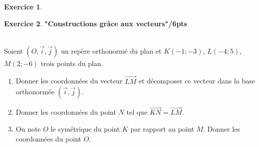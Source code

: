 \documentclass[a4paper,10.9pt]{article}
\theoremstyle{definition}
\newtheorem{exo}{Exercice}
\newcommand{\V}{\overrightarrow}
\begin{document}
\begin{exo}
\begin{minipage}[c]{1.0\linewidth}
\begin{minipage}[c]{0.45\linewidth}
\end{minipage}
\end{minipage}
\end{exo}

\begin{exo} \textbf{"Constructions grâce aux vecteurs"}\hfill\textbf{/6pts}\\\hfil\\

\begin{minipage}[t]{1.0\linewidth}
Soient $(O,\V{i}, \V{j})$ un repère orthonormé du plan et $K(-1;-3)$, $L(-4;5)$,  $M(2;-6)$ trois points du plan.\\ 
\begin{enumerate}
\item Donner les coordonnées du vecteur $\V{LM}$ et décomposer ce vecteur dans la base orthonormée  $(\V{i}, \V{j})$.\\
\item Donner les coordonnées du point $N$ tel que $\V{KN}=\V{LM}$.\\
\item On note $O$ le symétrique du point $K$ par rapport au point $M$. Donner les coordonnées du point $O$.\\

\end{enumerate}
\end{minipage}

\end{exo}
\end{document}
